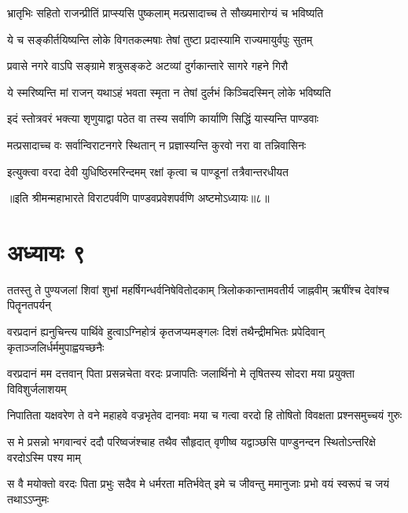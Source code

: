 \twolineshloka
{भ्रातृभिः सहितो राजन्प्रीतिं प्राप्स्यसि पुष्कलाम्}
{मत्प्रसादाच्च ते सौख्यमारोग्यं च भविष्यति}


\twolineshloka
{ये च सङ्कीर्तयिष्यन्ति लोके विगतकल्मषाः}
{तेषां तुष्टा प्रदास्यामि राज्यमायुर्वपुः सुतम्}


\twolineshloka
{प्रवासे नगरे वाऽपि सङ्ग्रामे शत्रुसङ्कटे}
{अटव्यां दुर्गकान्तारे सागरे गहने गिरौ}


\twolineshloka
{ये स्मरिष्यन्ति मां राजन् यथाऽहं भवता स्मृता}
{न तेषां दुर्लभं किञ्चिदस्मिन् लोके भविष्यति}


\twolineshloka
{इदं स्तोत्रवरं भक्त्या शृणुयाद्वा पठेत वा}
{तस्य सर्वाणि कार्याणि सिद्धिं यास्यन्ति पाण्डवाः}


\twolineshloka
{मत्प्रसादाच्च वः सर्वान्विराटनगरे स्थितान्}
{न प्रज्ञास्यन्ति कुरवो नरा वा तन्निवासिनः}


\twolineshloka
{इत्युक्त्वा वरदा देवी युधिष्ठिरमरिन्दमम्}
{रक्षां कृत्वा च पाण्डूनां तत्रैवान्तरधीयत}



॥इति श्रीमन्महाभारते विराटपर्वणि पाण्डवप्रवेशपर्वणि अष्टमोऽध्यायः॥८॥

\chapter{अध्यायः ९}

\fourlineindentedshloka
{ततस्तु ते पुण्यजलां शिवां शुभां}
{महर्षिगन्धर्वनिषेवितोदकाम्}
{त्रिलोककान्तामवतीर्य जाह्नवीम्}
{ऋषींश्च देवांश्च पितॄनतपर्यन्}


\fourlineindentedshloka
{वरप्रदानं ह्यनुचिन्त्य पार्थिवे}
{हुत्वाऽग्निहोत्रं कृतजप्यमङ्गलः}
{दिशं तथैन्द्रीमभितः प्रपेदिवान्}
{कृताञ्जलिर्धर्ममुपाह्वयच्छनैः}




\fourlineindentedshloka
{वरप्रदानं मम दत्तवान् पिता}
{प्रसन्नचेता वरदः प्रजापतिः}
{जलार्थिनो मे तृषितस्य सोदरा}
{मया प्रयुक्ता विविशुर्जलाशयम्}


\fourlineindentedshloka
{निपातिता यक्षवरेण ते वने}
{महाहवे वज्रभृतेव दानवाः}
{मया च गत्वा वरदो हि तोषितो}
{विवक्षता प्रश्नसमुच्चयं गुरुः}


\fourlineindentedshloka
{स मे प्रसन्नो भगवान्वरं ददौ}
{परिष्वजंश्चाह तथैव सौहृदात्}
{वृणीष्व यद्वाञ्छसि पाण्डुनन्दन}
{स्थितोऽन्तरिक्षे वरदोऽस्मि पश्य माम्}


\fourlineindentedshloka
{स वै मयोक्तो वरदः पिता प्रभुः}
{सदैव मे धर्मरता मतिर्भवेत्}
{इमे च जीवन्तु ममानुजाः प्रभो}
{वयं स्वरूपं च जयं तथाऽऽप्नुमः}


